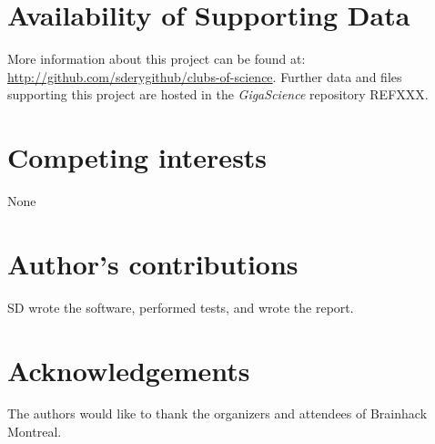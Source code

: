 \documentclass[twocolumn]{bmcart}%
\begin{document}
\begin{backmatter}

\section*{Availability of Supporting Data}
More information about this project can be found at: \url{http://github.com/sderygithub/clubs-of-science}. Further data and files supporting this project are hosted in the \emph{GigaScience} repository REFXXX.

\section*{Competing interests}
None

\section*{Author's contributions}
SD wrote the software, performed tests, and wrote the report.

\section*{Acknowledgements}
The authors would like to thank the organizers and attendees of
Brainhack Montreal.





\end{backmatter}
\end{document}

